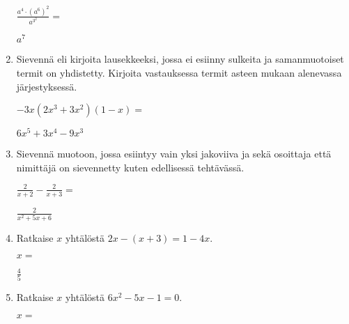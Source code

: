 \documentclass[finnish, a4paper, 12pt]{article}
\begin{document}
\begin{enumerate}[leftmargin=*]
		\(
		\displaystyle
		\frac{a^4 \cdot \left(a^6\right)^2}{a^{3^2}} =
		\phantom{mmmmmmmmmmmmmmm}
		\) %
		\begin{version:withAnswers}
		\(  a^{7} \)
		\end{version:withAnswers}
		
		\vspace{8pt}
		
		\item %
		Sievennä eli kirjoita lausekkeeksi, jossa ei esiinny sulkeita ja 
		samanmuotoiset termit on yhdistetty. 
		Kirjoita vastauksessa termit asteen mukaan alenevassa järjestyksessä. 
		
		\(
		\displaystyle
		-3x(2x^3 + 3x^2)(1 - x) = 
		\) %
		\begin{version:withAnswers}
		\( 6x^5 + 3x^4 -9x^3 \)
		\end{version:withAnswers}
		
		\vspace{8pt}
		
		\item %
		Sievennä %
		muotoon, jossa esiintyy vain yksi jakoviiva ja sekä osoittaja
		että nimittäjä on sievennetty kuten edellisessä tehtävässä.
		
		\(
		\displaystyle
		\frac{2}{x+2}- \frac{2}{x + 3} =
		\) %
		\begin{version:withAnswers}
		\( \frac{2}{x^2+5x+6} \)
		\end{version:withAnswers}
		
		\vspace{8pt}
		
		\item %
		Ratkaise \(x\) yhtälöstä \(2x - (x+3) = 1 - 4x\).
		
		\(
		x = 
		\)	%
		\begin{version:withAnswers}
		 \( \frac{4}{5} \)
		\end{version:withAnswers}
		\vspace{8pt}
		
		\item %
		Ratkaise \(x\) yhtälöstä \(6x^2-5x-1= 0\).
		
		\(
		x = 		
		\)	%
		

\end{enumerate}
\end{document}
